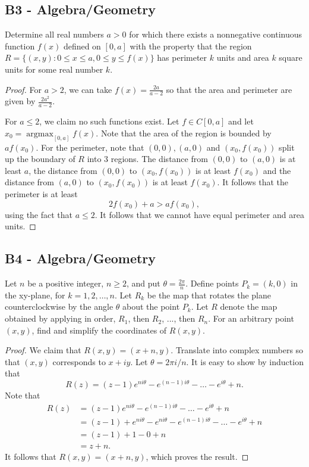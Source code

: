 \documentclass[11pt]{scrartcl}
\newcommand{\<}{\langle}
\renewcommand{\>}{\rangle}
\begin{document}
\subsection{B3 - Algebra/Geometry}
Determine all real numbers $a>0$ for which there exists a nonnegative continuous function $f(x)$ defined on $[0,a]$ with the property that the region
$R=\{(x,y): 0\le x\le a, 0\le y\le f(x)\}$
has perimeter $k$ units and area $k$ square units for some real number $k$.
\begin{proof}
For $a > 2$, we can take $f(x) = \frac{2a}{a-2}$ so that the area and perimeter are given by $\frac{2a^2}{a-2}$.

For $a \le 2$, we claim no such functions exist. Let $f \in C[0, a]$ and let $x_0 = \operatorname{argmax}_{[0, a]} f(x)$. Note that the area of the region is bounded by $af(x_0)$. For the perimeter, note that $(0, 0), (a, 0)$ and $(x_0, f(x_0))$ split up the boundary of $R$ into $3$ regions. The distance from $(0, 0)$ to $(a, 0)$ is at least $a$, the distance from $(0, 0)$ to $(x_0, f(x_0))$ is at least $f(x_0)$ and the distance from $(a, 0)$ to $(x_0, f(x_0))$ is at least $f(x_0)$. It follows that the perimeter is at least
$$2f(x_0) + a > af(x_0),$$using the fact that $a \le 2$. It follows that we cannot have equal perimeter and area units.
\end{proof}
\subsection{B4 - Algebra/Geometry}
Let $n$ be a positive integer, $n \ge 2$, and put $\theta=\frac{2\pi}{n}$. Define points $P_k=(k,0)$ in the xy-plane, for $k=1,2,\dots,n$. Let $R_k$ be the map that rotates the plane counterclockwise by the angle $\theta$ about the point $P_k$. Let $R$ denote the map obtained by applying in order, $R_1$, then $R_2$, ..., then $R_n$. For an arbitrary point $(x,y)$, find and simplify the coordinates of $R(x,y)$.
\begin{proof}
We claim that $R(x, y) = (x + n, y)$.  Translate into complex numbers so that $(x, y)$ corresponds to $x + iy$.    Let $\theta = 2\pi i /n$.  It is easy to show by induction that 
$$R(z) = (z-1) e^{ni \theta} - e^{(n-1)i\theta} - \dots - e^{i\theta} + n.$$
Note that 
\begin{align*}
R(z) &= (z-1) e^{ni \theta} - e^{(n-1)i\theta} - \dots - e^{i\theta} + n \\
&= (z-1) + e^{ni\theta} - e^{ni\theta}- e^{(n-1)i\theta} - \dots - e^{i\theta} + n \\
&= (z - 1) + 1 - 0 + n \\
&= z + n.
\end{align*}
It follows that $R(x, y) = (x + n, y)$, which proves the result. 
\end{proof}
\pagebreak
\end{document}
